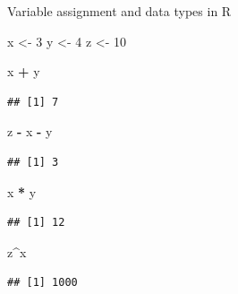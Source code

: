 \documentclass[
  ignorenonframetext,
]{beamer}
\newenvironment{Shaded}{\begin{snugshade}}{\end{snugshade}}
\newcommand{\DecValTok}[1]{\textcolor[rgb]{0.00,0.00,0.81}{#1}}
\newcommand{\NormalTok}[1]{#1}
\newcommand{\OperatorTok}[1]{\textcolor[rgb]{0.81,0.36,0.00}{\textbf{#1}}}
\newcommand{\StringTok}[1]{\textcolor[rgb]{0.31,0.60,0.02}{#1}}
\begin{document}
\begin{frame}[fragile]{Variable assignment and data types in R}
\protect\hypertarget{variable-assignment-and-data-types-in-r}{}

\begin{Shaded}
\begin{Highlighting}[]
\NormalTok{x <-}\StringTok{ }\DecValTok{3}
\NormalTok{y <-}\StringTok{ }\DecValTok{4}
\NormalTok{z <-}\StringTok{ }\DecValTok{10}

\NormalTok{x }\OperatorTok{+}\StringTok{ }\NormalTok{y}
\end{Highlighting}
\end{Shaded}

\begin{verbatim}
## [1] 7
\end{verbatim}

\begin{Shaded}
\begin{Highlighting}[]
\NormalTok{z }\OperatorTok{-}\StringTok{ }\NormalTok{x }\OperatorTok{-}\StringTok{ }\NormalTok{y}
\end{Highlighting}
\end{Shaded}

\begin{verbatim}
## [1] 3
\end{verbatim}

\begin{Shaded}
\begin{Highlighting}[]
\NormalTok{x }\OperatorTok{*}\StringTok{ }\NormalTok{y}
\end{Highlighting}
\end{Shaded}

\begin{verbatim}
## [1] 12
\end{verbatim}

\begin{Shaded}
\begin{Highlighting}[]
\NormalTok{z}\OperatorTok{^}\NormalTok{x}
\end{Highlighting}
\end{Shaded}

\begin{verbatim}
## [1] 1000
\end{verbatim}

\end{frame}
\end{document}

